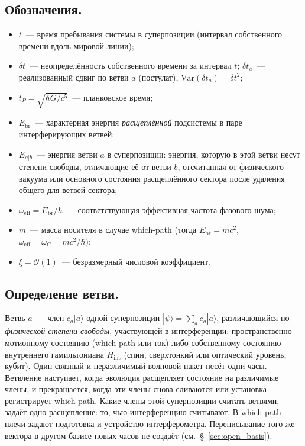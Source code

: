 \documentclass[12pt,a4paper]{article}
\begin{document}
\subsection{Обозначения.}
\begin{itemize}
\item $t$~--- время пребывания системы в суперпозиции (интервал собственного времени вдоль мировой линии);
\item $\delta t$~--- неопределённость собственного времени за интервал $t$; $\delta t_a$~--- реализованный сдвиг по ветви $a$ (постулат), $\mathrm{Var}(\delta t_a)=\delta t^2$;
\item $t_P=\sqrt{\hbar G/c^5}$~--- планковское время;
\item $E_{\mathrm{br}}$~--- характерная энергия \emph{расщеплённой} подсистемы в паре интерферирующих ветвей;
\item $E_{a|b}$~--- энергия ветви $a$ в суперпозиции: энергия, которую в этой ветви несут степени свободы, отличающие её от ветви $b$, отсчитанная от физического вакуума или основного состояния расщеплённого сектора после удаления общего для ветвей сектора;
\item $\omega_{\mathrm{eff}}=E_{\mathrm{br}}/\hbar$~--- соответствующая эффективная частота фазового шума;
\item $m$~--- масса носителя в случае which-path (тогда $E_{\mathrm{br}}=mc^2$, $\omega_{\mathrm{eff}}=\omega_C=mc^2/\hbar$);
\item $\xi=\mathcal O(1)$~--- безразмерный числовой коэффициент.
\end{itemize}

\subsection{Определение ветви.}
\label{sec:branch_def}
Ветвь $a$~--- член $c_a|a\rangle$ одной суперпозиции $|\psi\rangle=\sum_a c_a|a\rangle$, различающийся по \emph{физической степени свободы}, участвующей в интерференции: пространственно-мотионному состоянию (which-path или ток) либо собственному состоянию внутреннего гамильтониана $H_{\mathrm{int}}$ (спин, сверхтонкий или оптический уровень, кубит). Один связный и неразличимый волновой пакет несёт одни часы. Ветвление наступает, когда эволюция расщепляет состояние на различимые члены, и прекращается, когда эти члены снова сливаются или установка регистрирует which-path. Какие члены этой суперпозиции считать ветвями, задаёт одно расщепление: то, чью интерференцию считывают. В which-path плечи задают подготовка и устройство интерферометра. Переписывание того же вектора в другом базисе новых часов не создаёт (см.~\S~\ref{sec:open_basis}).
\end{document}
